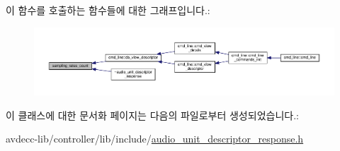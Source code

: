 이 함수를 호출하는 함수들에 대한 그래프입니다.\+:
\nopagebreak
\begin{figure}[H]
\begin{center}
\leavevmode
\includegraphics[width=350pt]{classavdecc__lib_1_1audio__unit__descriptor__response_a07f5bff31c9d15bb4a2e300ddb5be5b7_icgraph}
\end{center}
\end{figure}




이 클래스에 대한 문서화 페이지는 다음의 파일로부터 생성되었습니다.\+:\begin{DoxyCompactItemize}
\item 
avdecc-\/lib/controller/lib/include/\hyperlink{audio__unit__descriptor__response_8h}{audio\+\_\+unit\+\_\+descriptor\+\_\+response.\+h}\end{DoxyCompactItemize}
